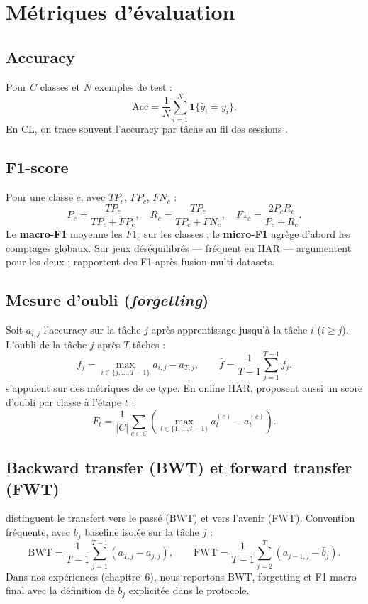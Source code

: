 \documentclass[a4paper,12pt]{report}
\begin{document}
\section{Métriques d'évaluation}

\subsection{Accuracy}

Pour $C$ classes et $N$ exemples de test :
\[
\mathrm{Acc} = \frac{1}{N}\sum_{i=1}^{N} \mathbf{1}\{\hat{y}_i = y_i\}.
\]
En CL, on trace souvent l'accuracy par tâche au fil des sessions
\parencite{delange2021}.

\subsection{F1-score}

Pour une classe $c$, avec $TP_c$, $FP_c$, $FN_c$ :
\[
P_c = \frac{TP_c}{TP_c + FP_c}, \quad
R_c = \frac{TP_c}{TP_c + FN_c}, \quad
F1_c = \frac{2 P_c R_c}{P_c + R_c}.
\]
Le \textbf{macro-F1} moyenne les $F1_c$ sur les classes ; le \textbf{micro-F1}
agrège d'abord les comptages globaux. Sur jeux déséquilibrés — fréquent en
HAR — \textcite{schiemer2023} argumentent pour les deux ; \textcite{amrani2025}
rapportent des F1 après fusion multi-datasets.

\subsection{Mesure d'oubli (\emph{forgetting})}

Soit $a_{i,j}$ l'accuracy sur la tâche $j$ après apprentissage jusqu'à la
tâche $i$ ($i \geq j$). L'oubli de la tâche $j$ après $T$ tâches :
\[
f_j = \max_{i \in \{j,\ldots,T-1\}} a_{i,j} - a_{T,j}, \qquad
\bar{f} = \frac{1}{T-1}\sum_{j=1}^{T-1} f_j.
\]
\textcite{delange2021} s'appuient sur des métriques de ce type. En online HAR,
\textcite{schiemer2023} proposent aussi un score d'oubli par classe à l'étape
$t$ :
\[
F_t = \frac{1}{|C|}\sum_{c \in C}
\left(\max_{l \in \{1,\ldots,t-1\}} a_l^{(c)} - a_t^{(c)}\right).
\]

\subsection{Backward transfer (BWT) et forward transfer (FWT)}

\textcite{vdven2022} distinguent le transfert vers le passé (BWT) et vers
l'avenir (FWT). Convention fréquente, avec $\bar{b}_j$ baseline isolée sur la
tâche $j$ :
\[
\mathrm{BWT} = \frac{1}{T-1}\sum_{j=1}^{T-1} (a_{T,j} - a_{j,j}), \qquad
\mathrm{FWT} = \frac{1}{T-1}\sum_{j=2}^{T} (a_{j-1,j} - \bar{b}_j).
\]
Dans nos expériences (chapitre~6), nous reportons BWT, forgetting et F1 macro
final avec la définition de $\bar{b}_j$ explicitée dans le protocole.
\end{document}
